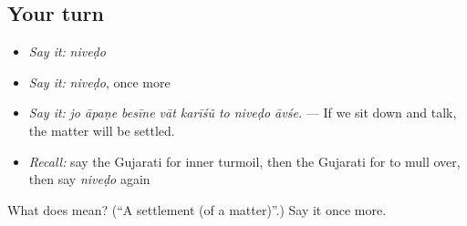 \subsection*{Your turn}
\begin{itemize}
\raggedright
  \item \emph{Say it:} \emph{niveḍo}
  \item \emph{Say it:} \emph{niveḍo}, once more
  \item \emph{Say it:} \emph{jo āpaṇe besīne vāt karīśũ to niveḍo āvśe.} — If we sit down and talk, the matter will be settled.
  \item \emph{Recall:} say the Gujarati for inner turmoil, then the Gujarati for to mull over, then say \emph{niveḍo} again
\end{itemize}

\begin{tcolorbox}[breakable,colback=teal!4,colframe=teal!35!black,title={Before you move on}]
What does  mean? (\textquotedblleft{}A settlement (of a matter)\textquotedblright{}.) Say it once more.
\end{tcolorbox}
